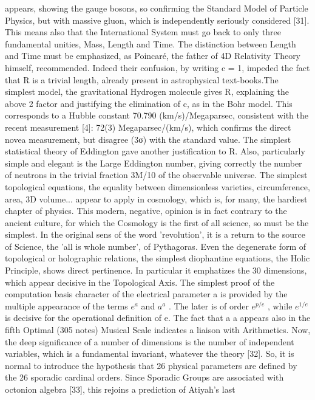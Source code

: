 appears, showing the gauge bosons, so confirming the Standard Model of Particle Physics, but with
massive gluon, which is independently seriously considered [31].
This means also that the International System must go back to only three fundamental unities,
Mass, Length and Time. The distinction between Length and Time must be emphasized, as
Poincaré, the father of 4D Relativity Theory himself, recommended. Indeed their confusion, by
writing c = 1, impeded the fact that R is a trivial length, already present in astrophysical text-books.The simplest model, the gravitational Hydrogen molecule gives R, explaining the above 2 factor
and justifying the elimination of c, as in the Bohr model. This corresponds to a Hubble constant
70.790 (km/s)/Megaparsec, consistent with the recent measurement [4]: 72(3) Megaparsec/(km/s),
which confirms the direct novea measurement, but disagree (3σ) with the standard value.
The simplest statistical theory of Eddington gave another justification to R. Also, particularly
simple and elegant is the Large Eddington number, giving correctly the number of neutrons in the
trivial fraction 3M/10 of the observable universe.
The simplest topological equations, the equality between dimensionless varieties, circumference,
area, 3D volume... appear to apply in cosmology, which is, for many, the hardiest chapter of
physics. This modern, negative, opinion is in fact contrary to the ancient culture, for which the
Cosmology is the first of all science, so must be the simplest. In the original sens of the word
'revolution', it is a return to the source of Science, the 'all is whole number', of Pythagoras. Even the
degenerate form of topological or holographic relations, the simplest diophantine equations, the
Holic Principle, shows direct pertinence. In particular it emphatizes the 30 dimensions, which
appear decisive in the Topological Axis.
The simplest proof of the computation basis character of the electrical parameter a is provided
by the multiple appearance of the terms $e^a$ and $a^a$ . The later is of order $e^{p/e}$ , while $e^{1/e}$ is decisive for
the operational definition of e. The fact that a a appears also in the fifth Optimal (305 notes) Musical
Scale indicates a liaison with Arithmetics.
Now, the deep significance of a number of dimensions is the number of independent variables,
which is a fundamental invariant, whatever the theory [32]. So, it is normal to introduce the
hypothesis that 26 physical parameters are defined by the 26 sporadic cardinal orders. Since
Sporadic Groups are associated with octonion algebra [33], this rejoins a prediction of Atiyah's last
